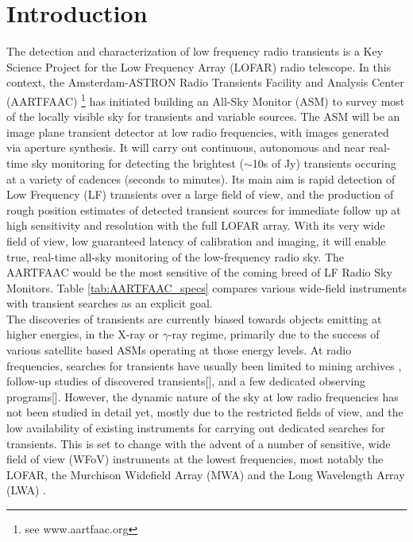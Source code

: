\documentclass{aa}
\begin{document}

\maketitle

\section{\label{sec:Introduction}Introduction}
The detection  and characterization of low  frequency radio transients  is a Key
Science  Project \citep{fender2006lofar}  for  the Low  Frequency Array  (LOFAR)
\citep{vanhaarlem2013lofar}   radio    telescope.    In   this    context,   the
Amsterdam-ASTRON    Radio    Transients    Facility    and    Analysis    Center
(AARTFAAC) \footnote{see  www.aartfaac.org }  has initiated building  an All-Sky
Monitor  (ASM) to  survey most  of the  locally visible  sky for  transients and
variable sources.   The ASM  will be  an image plane  transient detector  at low
radio frequencies, with images generated  via aperture synthesis.  It will carry
out continuous, autonomous  and near real-time sky monitoring  for detecting the
brightest  ($\sim$10s  of Jy)  transients  occuring  at  a variety  of  cadences
(seconds to  minutes). Its  main aim  is rapid detection  of Low  Frequency (LF)
transients over  a large  field of  view, and the  production of  rough position
estimates  of  detected  transient  sources  for immediate  follow  up  at  high
sensitivity and resolution  with the full LOFAR array. With  its very wide field
of view, low guaranteed latency of calibration and imaging, it will enable true,
real-time all-sky monitoring of the  low-frequency radio sky. The AARTFAAC would
be  the most sensitive  of the  coming breed  of LF  Radio Sky  Monitors.  Table
\ref{tab:AARTFAAC_specs} compares various  wide-field instruments with transient
searches as an explicit goal.\\

The discoveries of  transients are currently biased towards  objects emitting at
higher  energies, in  the X-ray  or $\gamma$-ray  regime, primarily  due  to the
success of  various satellite  based ASMs operating  at those energy  levels. At
radio frequencies, searches  for transients have usually been  limited to mining
archives  \citep{bower2007submillijansky,bower2011search}, follow-up  studies of
discovered     transients{[}{]},    and     a     few    dedicated     observing
programs{[}{]}. However, the dynamic nature  of the sky at low radio frequencies
has not been studied in detail yet, mostly due to the restricted fields of view,
and  the low  availability of  existing instruments  for carrying  out dedicated
searches for transients.  This  is set to change with the advent  of a number of
sensitive, wide field of view (WFoV) instruments at the lowest frequencies, most
notably     the     LOFAR,     the     Murchison    Widefield     Array     (MWA)
\citep{lonsdale2009murchison}    and   the    Long   Wavelength    Array   (LWA)
\citep{ellingson2009long}.
\end{document}
